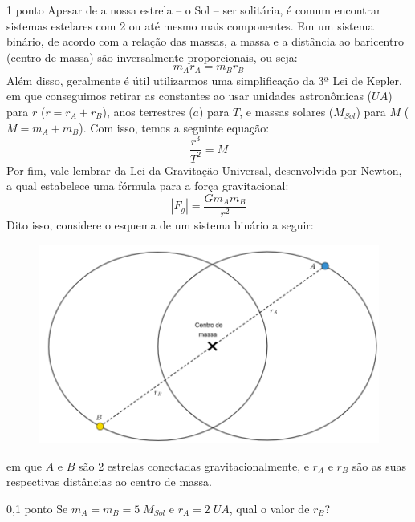 \documentclass{../lista}
\begin{document}
	\begin{questao}{1 ponto}
		Apesar de a nossa estrela -- o Sol -- ser solitária, é comum encontrar sistemas estelares com 2 ou até mesmo mais componentes. Em um sistema binário, de acordo com a relação das massas, a massa e a distância ao baricentro (centro de massa) são inversalmente proporcionais, ou seja:
		\begin{equation}
			m_Ar_A=m_Br_B
		\end{equation}
		Além disso, geralmente é útil utilizarmos uma simplificação da 3ª Lei de Kepler, em que conseguimos retirar as constantes ao usar unidades astronômicas ($UA$) para $r$ ($r=r_A+r_B$), anos terrestres ($a$) para $T$, e massas solares ($M_{Sol}$) para $M$ ($M=m_A+m_B$). Com isso, temos a seguinte equação:
		\begin{equation}
			\frac{r^3}{T^2}=M
		\end{equation}
		Por fim, vale lembrar da Lei da Gravitação Universal, desenvolvida por Newton, a qual estabelece uma fórmula para a força gravitacional:
		\begin{equation}
			| F_g | = \frac{Gm_Am_B}{r^2}
		\end{equation}
		Dito isso, considere o esquema de um sistema binário a seguir:
		\begin{figure}[H]
			\centering
			\includegraphics[scale=0.4]{./img/5.png}
		\end{figure}
		em que $A$ e $B$ são 2 estrelas conectadas gravitacionalmente, e $r_A$ e $r_B$ são as suas respectivas distâncias ao centro de massa.

		\begin{pergunta}{0,1 ponto}
			Se $m_A=m_B= 5 \; M_{Sol}$ e $r_A=2 \; UA$, qual o valor de $r_B$?

			\espacoCalculo
			\espacoRespostaPergunta
		\end{pergunta}


\end{questao}
\end{document}
